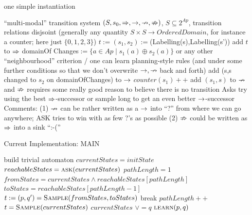 \documentclass{article}
\begin{document}
\begin{algorithm}
	\caption{one simple instantiation}\label{alg:learn}
	\begin{algorithmic}[1]
		\Require ``multi-modal'' transition system $(S,s_0,\Rightarrow,\rightarrow,\nrightarrow,\nRightarrow)$, $S\subseteq 2^{Ap}$, transition relations disjsoint (generally any quantity $S\times S\to \mathit{OrderedDomain}$, for instance a counter; here just $\{0,1,2,3\}$)
		\State $t:=(s_1,s_2):=$(Labelling(s),Labelling(s'))
		\State add $t$ to $\Rightarrow$
		\State domainOf Changes$:=\{a\in Ap\mid s_1(a)\oplus s_2(a)\}$
		\State \Comment or any other ``neighbourhood'' criterion / one can learn planning-style rules
		\State \Comment(and under some further conditions so that we don't overwrite $\rightarrow,\nrightarrow$ back and forth)
		\State add (s,s changed to $s_2$ on domainOfChanges) to $\rightarrow$
		\EndFor
		\EndIf
		\State $counter(s_1)++$
		\State add $(s_1,s)$ to $\nrightarrow$
		\EndFor
		\EndIf
		\EndProcedure
		\State\Comment and $\nRightarrow$ requires some really good reason to believe there is no transition
		\Procedure Ask{s}
		\State try using the best $\Rightarrow$-successor or sample long to get an even better $\rightarrow$-successor
		\EndProcedure
		\newline
		\State Comments: 
		\State (1) $\nrightarrow$ can be rather written as a $\rightarrow$ into ``?'' from where we can go anywhere; ASK tries to win with as few ?'s as possible
		\State (2) $\nRightarrow$ could be written as $\Rightarrow$ into a sink ``:-(''
	\end{algorithmic}
\end{algorithm}



\begin{algorithm}
	\caption{Current Implementation: MAIN}\label{alg:current_main}
	\begin{algorithmic}[1]
		\State build trivial automaton
		\State $currentStates=initState$
			\State $reachableStates=\Call{ask}{currentStates}$ 
			\State {}
			\State $pathLength=1$
				\State $fromStates=currentStates\wedge reachableStates[pathLength]$
				\State $toStates=reachableStates[pathLength-1]$
				\State$t:=(p,q')=\Call{Sample}{fromStates, toStates}$
					\State break
				\EndIf 
				\State $pathLength++$
			\EndWhile
		\State $t=\Call{Sample}{currentStates}$
		\EndIf
		\State $currentStates$ $\vee= q$
		\State $\Call{learn}{p,q}$
		\State {}
		\EndIf
		\EndWhile
	\end{algorithmic}
\end{algorithm}
\end{document}
